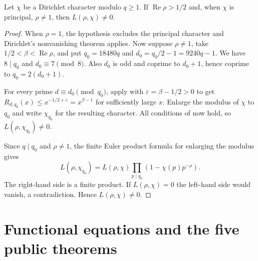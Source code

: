 \begin{theorem}
\label{thm:half-plane}
\emitthmsource
Let $\chi$ be a Dirichlet character modulo $q\ge1$. If $\operatorname{Re}\rho>1/2$ and, when $\chi$ is principal, $\rho\ne1$, then $L(\rho,\chi)\ne0$.
\end{theorem}
\begin{proof}
When $\rho=1$, the hypothesis excludes the principal character and Dirichlet's nonvanishing theorem applies. Now suppose $\rho\ne1$, take $1/2<\beta<\operatorname{Re}\rho$, and put $q_0=18480q$ and $d_0=q_0/2-1=9240q-1$. We have $8\mid q_0$ and $d_0\equiv7\pmod8$. Also $d_0$ is odd and coprime to $d_0+1$, hence coprime to $q_0=2(d_0+1)$.

For every prime $d\equiv d_0\pmod{q_0}$, apply  with $\varepsilon=\beta-1/2>0$ to get $R_{d,q_0}(x)\le x^{-1/2+\varepsilon}=x^{\beta-1}$ for sufficiently large $x$. Enlarge the modulus of $\chi$ to $q_0$ and write $\chi_{q_0}$ for the resulting character. All conditions of  now hold, so $L(\rho,\chi_{q_0})\ne0$.

Since $q\mid q_0$ and $\rho\ne1$, the finite Euler product formula for enlarging the modulus gives
\[
 L(\rho,\chi_{q_0})=L(\rho,\chi)\prod_{p\mid q_0}(1-\chi(p)p^{-\rho}).
\]
The right-hand side is a finite product. If $L(\rho,\chi)=0$ the left-hand side would vanish, a contradiction. Hence $L(\rho,\chi)\ne0$.
\end{proof}

\section{Functional equations and the five public theorems}
\label{sec:public-theorems}

